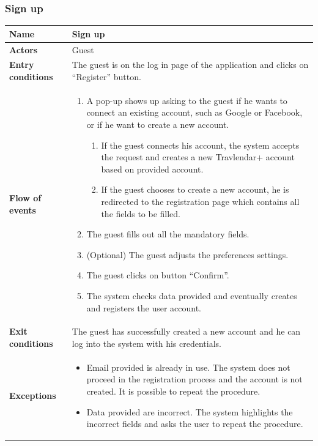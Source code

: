 \subsubsection{Sign up}
\begin{table}[!h]
	\centering
	{\renewcommand{\arraystretch}{2}%
		\begin{tabular}{|l|p{12cm}|}
			\hline
			\textbf{Name} 				& \textbf{Sign up} \\ \hline
			\textbf{Actors} 			& Guest \\ \hline
			\textbf{Entry conditions} 	& The guest is on the log in page of the application and clicks on “Register” button. \\ \hline
			\textbf{Flow of events}		& \begin{minipage}[t]{0.75\textwidth}
				\begin{enumerate}
					\item A pop-up shows up asking to the guest if he wants to connect an existing account, such as Google or Facebook, or if he want to create a new account.
					\begin{enumerate}
						\item If the guest connects his account, the system accepts the request and creates a new Travlendar+ account based on provided account.
						\item If the guest chooses to create a new account, he is redirected to the registration page which contains all the fields to be filled.
					\end{enumerate}
					\item The guest fills out all the mandatory fields.
					\item (Optional) The guest adjusts the preferences settings.
					\item The guest clicks on button “Confirm”.
					\item The system checks data provided and eventually creates and registers the user account.
				\end{enumerate}
			\end{minipage}	\\ \hline
			\textbf{Exit conditions}	& The guest has successfully created a new account and he can log into the system with his credentials. \\ \hline
			\textbf{Exceptions}			& \begin{minipage}[t]{0.75\textwidth}
				\begin{itemize}
					\item Email provided is already in use. The system does not proceed in the registration process and the account is not created. It is possible to repeat the procedure.
					\item Data provided are incorrect. The system highlights the incorrect fields and asks the user to repeat the procedure.
				\end{itemize} 
			\end{minipage} \\ \hline
	\end{tabular}}
\end{table}
\clearpage

